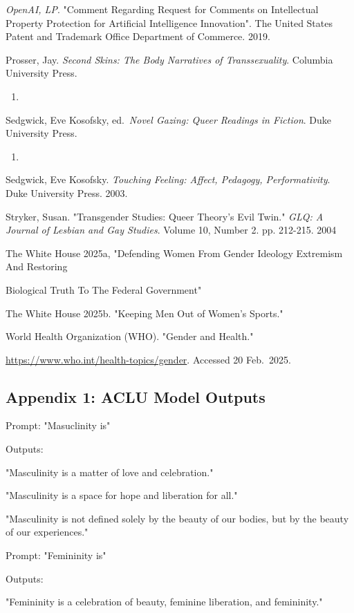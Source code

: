 \documentclass[11pt]{article}
\begin{document}
\emph{OpenAI, LP}. "Comment Regarding Request for Comments on Intellectual
Property Protection for Artificial Intelligence Innovation". The
United States Patent and Trademark Office Department of
Commerce. 2019.

Prosser, Jay. \emph{Second Skins: The Body Narratives of Transsexuality}.
Columbia University Press.

\begin{enumerate}
\item 
\end{enumerate}

Sedgwick, Eve Kosofsky, ed. \emph{Novel Gazing: Queer Readings in Fiction}.
Duke University Press.

\begin{enumerate}
\item 
\end{enumerate}

Sedgwick, Eve Kosofsky. \emph{Touching Feeling: Affect, Pedagogy,
Performativity}. Duke University Press. 2003.

Stryker, Susan. "Transgender Studies: Queer Theory's Evil Twin." \emph{GLQ:
A Journal of Lesbian and Gay Studies}. Volume 10, Number 2. pp.
212-215. 2004

The White House 2025a, "Defending Women From Gender Ideology Extremism
And Restoring

Biological Truth To The Federal Government"

The White House 2025b. "Keeping Men Out of Women's Sports."

World Health Organization (WHO). "Gender and Health."

\url{https://www.who.int/health-topics/gender}. Accessed 20 Feb. 2025.

\subsection{Appendix 1: ACLU Model Outputs}
\label{sec:org5dfc5d4}
Prompt: "Masuclinity is"

Outputs:

"Masculinity is a matter of love and celebration."

"Masculinity is a space for hope and liberation for all."

"Masculinity is not defined solely by the beauty of our bodies, but by
the beauty of our experiences."

Prompt: "Femininity is"

Outputs:

"Femininity is a celebration of beauty, feminine liberation, and
femininity."
\end{document}
